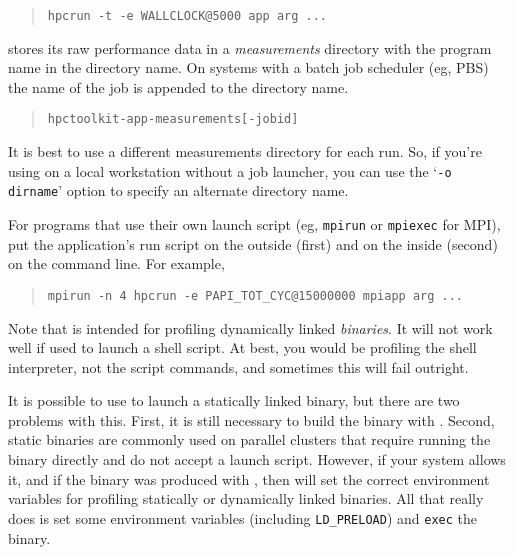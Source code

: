 \begin{quote}
\begin{verbatim}
hpcrun -t -e WALLCLOCK@5000 app arg ...
\end{verbatim}
\end{quote}

\hpcrun{} stores its raw performance data in a {\it measurements}
directory with the program name in the directory name.  On systems
with a batch job scheduler (eg, PBS) the name of the job is appended
to the directory name.

\begin{quote}
\begin{verbatim}
hpctoolkit-app-measurements[-jobid]
\end{verbatim}
\end{quote}

It is best to use a different measurements directory for each run.
So, if you're using \hpcrun{} on a local workstation without a job
launcher, you can use the `\verb|-o dirname|' option to specify an
alternate directory name.

For programs that use their own launch script (eg, \verb|mpirun| or
\verb|mpiexec| for MPI), put the application's run script on the
outside (first) and \hpcrun{} on the inside (second) on the command
line.  For example,

\begin{quote}
\begin{verbatim}
mpirun -n 4 hpcrun -e PAPI_TOT_CYC@15000000 mpiapp arg ...
\end{verbatim}
\end{quote}

Note that \hpcrun{} is intended for profiling dynamically linked {\it
binaries}.  It will not work well if used to launch a shell script.
At best, you would be profiling the shell interpreter, not the script
commands, and sometimes this will fail outright.

It is possible to use \hpcrun{} to launch a statically linked binary,
but there are two problems with this.  First, it is still necessary to
build the binary with \hpclink{}.  Second, static binaries are
commonly used on parallel clusters that require running the binary
directly and do not accept a launch script.  However, if your system
allows it, and if the binary was produced with \hpclink, then
\hpcrun{} will set the correct environment variables for profiling
statically or dynamically linked binaries.  All that \hpcrun{} really
does is set some environment variables (including \verb|LD_PRELOAD|)
and \verb|exec| the binary.

